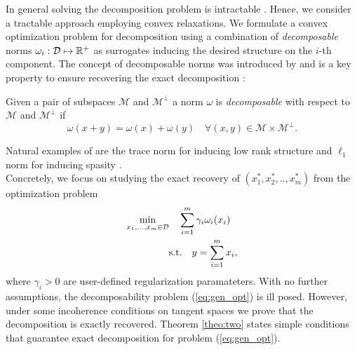 \documentclass{article}
\begin{document}
In general solving the decomposition problem is intractable . Hence, we consider a tractable approach employing convex relaxations. We formulate a convex optimization problem for decomposition using a combination of \emph{decomposable} norms $\omega_{i}:\mathcal{D}\mapsto \mathbb{R}^{+}$ as surrogates inducing the desired structure on the $i$-th component. The concept of decomposable norms was introduced by \citet{negahban2009unified} and is a key property to ensure recovering the exact decomposition :

\begin{mydef}
Given a pair of subspaces $\mathcal{M}$ and $\mathcal{M}^{\perp}$ a norm $\omega$ is
\emph{decomposable} with respect to $\mathcal{M}$ and $\mathcal{M}^{\perp}$ if
$$
\omega(x+y)=\omega(x)+\omega(y) \quad \forall (x,y)\in\mathcal{M}\times\mathcal{M}^{\perp}.
$$
\end{mydef}

Natural examples of are the trace norm for inducing low rank structure and $\ell_1$ norm for inducing spasity .\\

Concretely, we focus on studying the exact recovery of $(x_{1}^*,x_{2}^*,..,x_{m}^*)$ from the optimization problem 
\begin{align}
\label{eq:gen_opt}
\min_{x_{1},...,x_{m}\in\mathcal{D}} &\quad \sum_{i=1}^{m} \gamma_{i}\omega_{i}(x_{i})\\
&\text{s.t.} \quad y=\sum_{i=1}^{m}x_{i}, \nonumber
\end{align}
where $\gamma_{i}>0$ are  user-defined regularization paramateters. With no further assumptions, the decomposability problem (\ref{eq:gen_opt}) is ill posed. However, under some incoherence conditions on tangent spaces we prove that the decomposition is exactly recovered. Theorem \ref{theo:two} states simple conditions that guarantee exact decomposition for problem  (\ref{eq:gen_opt}).
\end{document}
